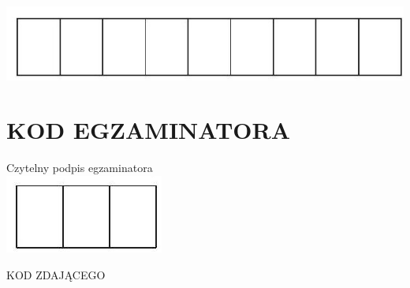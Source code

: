 \documentclass[10pt]{article}
\begin{document}
\begin{center}
\includegraphics[max width=\textwidth]{2024_11_21_b36d8cbb94edb763da2cg-22(1)}
\end{center}

\section*{KOD EGZAMINATORA}
Czytelny podpis egzaminatora\\
\includegraphics[max width=\textwidth, center]{2024_11_21_b36d8cbb94edb763da2cg-22}

KOD ZDAJĄCEGO
\end{document}
